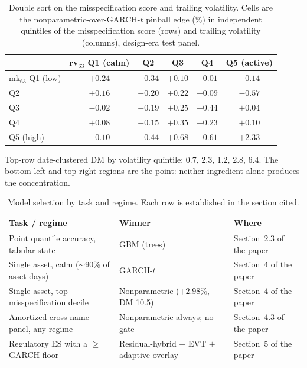 \documentclass[11pt]{article}
\begin{document}
\begin{table}[htbp]
\centering
\begin{threeparttable}
\caption{Double sort on the misspecification score and trailing volatility. Cells are the nonparametric-over-GARCH-$t$ pinball edge (\%)
in independent quintiles of the misspecification score (rows) and
trailing volatility (columns), design-era test panel.}
\label{tab:doublesort}
\footnotesize\setlength{\tabcolsep}{5pt}
\begin{tabular}{lccccc}
\toprule
 & rv$_{63}$ Q1 (calm) & Q2 & Q3 & Q4 & Q5 (active) \\
\midrule
mk$_{63}$ Q1 (low) & $+0.24$ & $+0.34$ & $+0.10$ & $+0.01$ & $-0.14$ \\
Q2 & $+0.16$ & $+0.20$ & $+0.22$ & $+0.09$ & $-0.57$ \\
Q3 & $-0.02$ & $+0.19$ & $+0.25$ & $+0.44$ & $+0.04$ \\
Q4 & $+0.08$ & $+0.15$ & $+0.35$ & $+0.23$ & $+0.10$ \\
Q5 (high) & $-0.10$ & $+0.44$ & $+0.68$ & $+0.61$ & $\mathbf{+2.33}$ \\
\bottomrule
\end{tabular}
\begin{tablenotes}\footnotesize
\item Top-row date-clustered DM by volatility quintile: 0.7, 2.3, 1.2,
2.8, 6.4. The bottom-left and top-right regions are the point:
neither ingredient alone produces the concentration.
\end{tablenotes}
\end{threeparttable}
\end{table}
\begin{table}[htbp]
\centering\small
\caption{Model selection by task and regime.
Each row is established in the section cited.}
\label{tab:decision}
\begin{tabular}{p{}p{}l}
\toprule
Task / regime & Winner & Where \\
\midrule
Point quantile accuracy, tabular state & GBM (trees) & Section~2.3 of the paper \\
Single asset, calm ($\sim$90\% of asset-days) & GARCH-$t$ & Section~4 of the paper \\
Single asset, top misspecification decile & Nonparametric ($+2.98\%$, DM 10.5) & Section~4 of the paper \\
Amortized cross-name panel, any regime & Nonparametric always; no gate & Section~4.3 of the paper \\
Regulatory ES with a $\ge$GARCH floor & Residual-hybrid $+$ EVT $+$ adaptive overlay & Section~5 of the paper \\
\bottomrule
\end{tabular}
\end{table}
\end{document}
